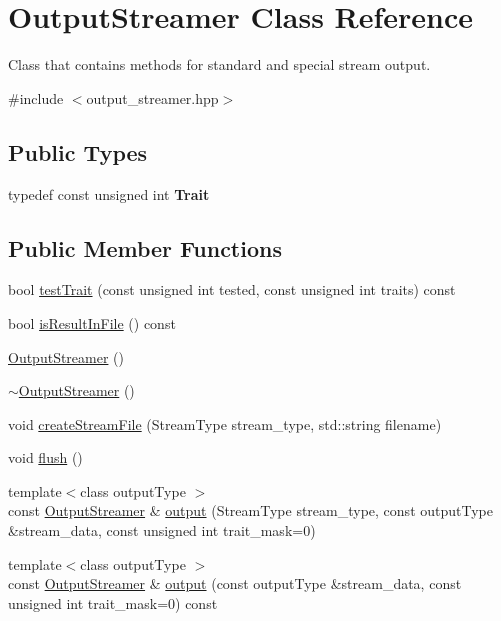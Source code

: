 \hypertarget{classOutputStreamer}{\section{\-Output\-Streamer \-Class \-Reference}
\label{classOutputStreamer}
}


\-Class that contains methods for standard and special stream output.  




{\ttfamily \#include $<$output\-\_\-streamer.\-hpp$>$}

\subsection*{\-Public \-Types}
\begin{DoxyCompactItemize}
\item 
\hypertarget{classOutputStreamer_afde0341c035a66313bc0c473545564df}{typedef const unsigned int {\bfseries \-Trait}}\label{classOutputStreamer_afde0341c035a66313bc0c473545564df}

\end{DoxyCompactItemize}
\subsection*{\-Public \-Member \-Functions}
\begin{DoxyCompactItemize}
\item 
bool \hyperlink{classOutputStreamer_ac69a0b5740c6789c289f32a847497bcb}{test\-Trait} (const unsigned int tested, const unsigned int traits) const 
\item 
bool \hyperlink{classOutputStreamer_ad687fb52400ddead1bed0ea6d85fec71}{is\-Result\-In\-File} () const 
\item 
\hyperlink{classOutputStreamer_a300cf2cf0796ac9f32fa7706dfe6e3f7}{\-Output\-Streamer} ()
\item 
\hyperlink{classOutputStreamer_a2c5b231daa95e75e3d97412bf2825522}{$\sim$\-Output\-Streamer} ()
\item 
void \hyperlink{classOutputStreamer_a4f9075e1f4d0990da619fc82e648ed3a}{create\-Stream\-File} (\-Stream\-Type stream\-\_\-type, std\-::string filename)
\item 
void \hyperlink{classOutputStreamer_ab5ba0f1791ea756e826b4fa503420915}{flush} ()
\item 
{\footnotesize template$<$class output\-Type $>$ }\\const \hyperlink{classOutputStreamer}{\-Output\-Streamer} \& \hyperlink{classOutputStreamer_aca59f9ceafef1709da0c99b1d381be0a}{output} (\-Stream\-Type stream\-\_\-type, const output\-Type \&stream\-\_\-data, const unsigned int trait\-\_\-mask=0)
\item 
{\footnotesize template$<$class output\-Type $>$ }\\const \hyperlink{classOutputStreamer}{\-Output\-Streamer} \& \hyperlink{classOutputStreamer_a0b80cd3ff924882963e7f90bb2cdc1f2}{output} (const output\-Type \&stream\-\_\-data, const unsigned int trait\-\_\-mask=0) const 
\end{DoxyCompactItemize}

